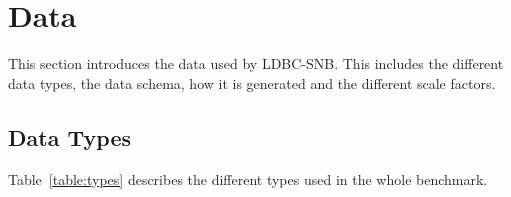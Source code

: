 
\section{Data}\label{section:data}

\newcommand{\attributecolumn}{p{2.5cm}}
\newcommand{\typecolumn}{p{2.7cm}}
\newcommand{\descriptioncolumn}{p{10.3cm}}


This section introduces the data used by LDBC-SNB. This includes the different
data types, the data schema, how it is generated and the different scale
factors.

\subsection{Data Types}
Table~\ref{table:types} describes the different types used in the whole benchmark.

